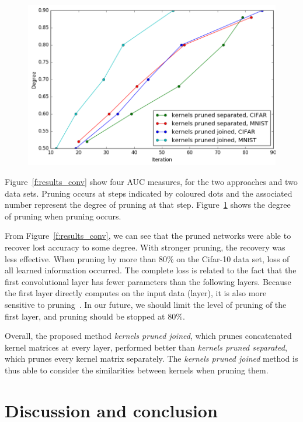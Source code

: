 \documentclass{article} %
\begin{document}
\begin{figure}[!ht]
\centering
\includegraphics[width=.8\linewidth]{degree_cnn.png}
\label{f:degree_conv}
\end{figure}

Figure~\ref{f:results_conv} show four AUC measures, for the two approaches and two
data sets. Pruning occurs at steps indicated by coloured dots and the associated number  
represent the degree of pruning at that step. Figure~\ref{f:degree_conv} shows the degree 
of pruning when pruning occurs.

From Figure~\ref{f:results_conv}, we can see that the pruned networks were able to 
recover lost accuracy to some degree. With stronger pruning, the recovery was less 
effective. When pruning by more than 80\% on the Cifar-10 data set, loss of all learned 
information occurred. The complete loss is related to the fact that the first 
convolutional layer has fewer parameters than the following layers. Because the first 
layer directly computes on the input data (layer), it is also more sensitive to 
pruning~\cite{anwar2015structured, han2015learning}. In our future, we should limit the 
level of pruning of the first layer, and pruning should be stopped at 80\%.

Overall, the proposed method \textit{kernels pruned joined}, which prunes concatenated 
kernel matrices at every layer, performed better than \textit{kernels pruned separated}, 
which prunes every kernel matrix separately. The \textit{kernels pruned joined} method is 
thus able to consider the similarities between kernels when pruning them.


\section{Discussion and conclusion}
\end{document}
